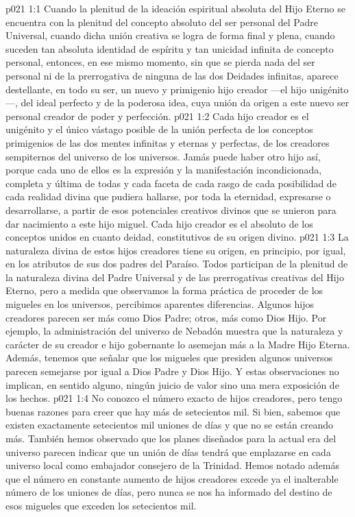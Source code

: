 \vs p021 1:1 Cuando la plenitud de la ideación espiritual absoluta del Hijo Eterno se encuentra con la plenitud del concepto absoluto del ser personal del Padre Universal, cuando dicha unión creativa se logra de forma final y plena, cuando suceden tan absoluta identidad de espíritu y tan unicidad infinita de concepto personal, entonces, en ese mismo momento, sin que se pierda nada del ser personal ni de la prerrogativa de ninguna de las dos Deidades infinitas, aparece destellante, en todo su ser, un nuevo y primigenio hijo creador ---el hijo unigénito---, del ideal perfecto y de la poderosa idea, cuya unión da origen a este nuevo ser personal creador de poder y perfección.
\vs p021 1:2 Cada hijo creador es el unigénito y el único vástago posible de la unión perfecta de los conceptos primigenios de las dos mentes infinitas y eternas y perfectas, de los creadores sempiternos del universo de los universos. Jamás puede haber otro hijo así, porque cada uno de ellos es la expresión y la manifestación incondicionada, completa y última de todas y cada faceta de cada rasgo de cada posibilidad de cada realidad divina que pudiera hallarse, por toda la eternidad, expresarse o desarrollarse, a partir de esos potenciales creativos divinos que se unieron para dar nacimiento a este hijo miguel. Cada hijo creador es el absoluto de los conceptos unidos en cuanto deidad, constitutivos de su origen divino.
\vs p021 1:3 La naturaleza divina de estos hijos creadores tiene su origen, en principio, por igual, en los atributos de sus dos padres del Paraíso. Todos participan de la plenitud de la naturaleza divina del Padre Universal y de las prerrogativas creativas del Hijo Eterno, pero a medida que observamos la forma práctica de proceder de los migueles en los universos, percibimos aparentes diferencias. Algunos hijos creadores parecen ser más como Dios Padre; otros, más como Dios Hijo. Por ejemplo, la administración del universo de Nebadón muestra que la naturaleza y carácter de su creador e hijo gobernante lo asemejan más a la Madre Hijo Eterna. Además, tenemos que señalar que los migueles que presiden algunos universos parecen semejarse por igual a Dios Padre y Dios Hijo. Y estas observaciones no implican, en sentido alguno, ningún juicio de valor sino una mera exposición de los hechos.
\vs p021 1:4 No conozco el número exacto de hijos creadores, pero tengo buenas razones para creer que hay más de setecientos mil. Si bien, sabemos que existen exactamente setecientos mil uniones de días y que no se están creando más. También hemos observado que los planes diseñados para la actual era del universo parecen indicar que un unión de días tendrá que emplazarse en cada universo local como embajador consejero de la Trinidad. Hemos notado además que el número en constante aumento de hijos creadores excede ya el inalterable número de los uniones de días, pero nunca se nos ha informado del destino de esos migueles que exceden los setecientos mil.
